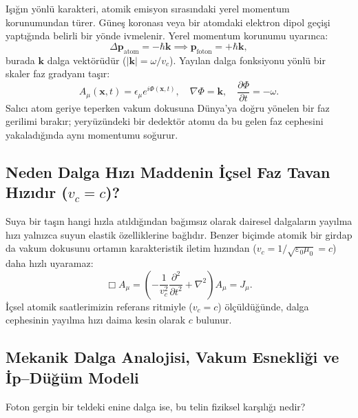 Işığın yönlü karakteri, atomik emisyon sırasındaki yerel momentum korunumundan türer. Güneş koronası veya bir atomdaki elektron dipol geçişi yaptığında belirli bir yönde ivmelenir. Yerel momentum korunumu uyarınca:
\begin{equation}
    \Delta \mathbf{p}_{\mathrm{atom}} = -\hbar \mathbf{k} \implies \mathbf{p}_{\mathrm{foton}} = +\hbar \mathbf{k},
    \label{eq:momentum_korunumu}
\end{equation}
burada $\mathbf{k}$ dalga vektörüdür ($|\mathbf{k}| = \omega / v_c$). Yayılan dalga fonksiyonu yönlü bir skaler faz gradyanı taşır:
\begin{equation}
    A_\mu(\mathbf{x}, t) = \epsilon_\mu e^{i \Phi(\mathbf{x}, t)}, \quad \nabla \Phi = \mathbf{k}, \quad \frac{\partial \Phi}{\partial t} = -\omega.
    \label{eq:yonlu_faz_denklemi}
\end{equation}
Salıcı atom geriye teperken vakum dokusuna Dünya'ya doğru yönelen bir faz gerilimi bırakır; yeryüzündeki bir dedektör atomu da bu gelen faz cephesini yakaladığında aynı momentumu soğurur.

\subsection{Neden Dalga Hızı Maddenin İçsel Faz Tavan Hızıdır (\texorpdfstring{$v_c = c$}{vc})?}
Suya bir taşın hangi hızla atıldığından bağımsız olarak dairesel dalgaların yayılma hızı yalnızca suyun elastik özelliklerine bağlıdır. Benzer biçimde atomik bir girdap da vakum dokusunu ortamın karakteristik iletim hızından ($v_c = 1/\sqrt{\varepsilon_0\mu_0} = c$) daha hızlı uyaramaz:
\begin{equation}
    \Box A_\mu = \left( -\frac{1}{v_c^2} \frac{\partial^2}{\partial t^2} + \nabla^2 \right) A_\mu = J_\mu.
    \label{eq:dalga_operatoru_vc}
\end{equation}
İçsel atomik saatlerimizin referans ritmiyle ($v_c = c$) ölçüldüğünde, dalga cephesinin yayılma hızı daima kesin olarak $c$ bulunur.

\subsection{Mekanik Dalga Analojisi, Vakum Esnekliği ve İp--Düğüm Modeli}
\label{sec:tel_ve_dugum_ontolojisi}

Foton gergin bir teldeki enine dalga ise, bu telin fiziksel karşılığı nedir?

